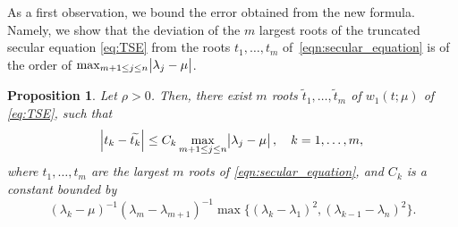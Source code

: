 \documentclass[11pt]{article}
\newtheorem{proposition}[theorem]{Proposition}
\begin{document}
As a first observation, we bound the error obtained from the new formula. Namely, we show that the deviation of the $m$ largest roots of the truncated secular equation \eqref{eq:TSE} from the roots $t_1,\ldots,t_m$ of~\eqref{eqn:secular_equation} is of the order of $\max_{m+1 \leq j \leq n} \abs{\lambda_j - \mu }$.
\begin{proposition} \label{prop:TSE_roots}
Let $\rho>0$. Then, there exist $m$ roots $\widetilde{t}_1,\ldots,\widetilde{t}_m$ of $w_{1}(t ; \mu)$ of \eqref{eq:TSE}, such that
\begin{equation} \label{eq:error_first_order}
\abs{ t_k-\widetilde{t_k}} \le C_k \max_{m+1 \leq j \leq n} \abs{\lambda_j - \mu}  , \quad k=1,\ldots,m,
\end{equation}
where ${t_1},\ldots,{t_m}$ are the largest $m$ roots of \eqref{eqn:secular_equation}, and $C_k$ is a constant bounded by 
\[ (\lambda_{k} - \mu) ^{-1}(\lambda_m - \lambda_{m+1})^{-1} \max \{ (\lambda_{k} - \lambda_1)^2,(\lambda_{k-1} - \lambda_{n})^2 \}. \]
\end{proposition}
\end{document}
